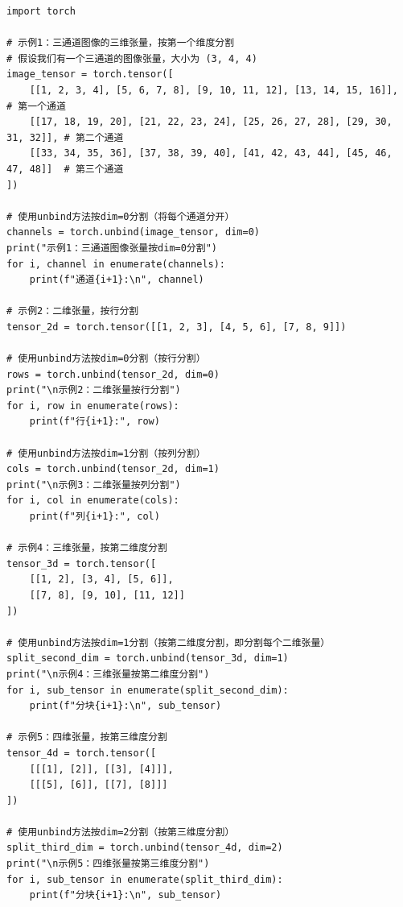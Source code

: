 \begin{lstlisting}[style=pythonstyle]
import torch

# 示例1：三通道图像的三维张量，按第一个维度分割
# 假设我们有一个三通道的图像张量，大小为 (3, 4, 4)
image_tensor = torch.tensor([
    [[1, 2, 3, 4], [5, 6, 7, 8], [9, 10, 11, 12], [13, 14, 15, 16]],    # 第一个通道
    [[17, 18, 19, 20], [21, 22, 23, 24], [25, 26, 27, 28], [29, 30, 31, 32]], # 第二个通道
    [[33, 34, 35, 36], [37, 38, 39, 40], [41, 42, 43, 44], [45, 46, 47, 48]]  # 第三个通道
])

# 使用unbind方法按dim=0分割（将每个通道分开）
channels = torch.unbind(image_tensor, dim=0)
print("示例1：三通道图像张量按dim=0分割")
for i, channel in enumerate(channels):
    print(f"通道{i+1}:\n", channel)

# 示例2：二维张量，按行分割
tensor_2d = torch.tensor([[1, 2, 3], [4, 5, 6], [7, 8, 9]])

# 使用unbind方法按dim=0分割（按行分割）
rows = torch.unbind(tensor_2d, dim=0)
print("\n示例2：二维张量按行分割")
for i, row in enumerate(rows):
    print(f"行{i+1}:", row)

# 使用unbind方法按dim=1分割（按列分割）
cols = torch.unbind(tensor_2d, dim=1)
print("\n示例3：二维张量按列分割")
for i, col in enumerate(cols):
    print(f"列{i+1}:", col)

# 示例4：三维张量，按第二维度分割
tensor_3d = torch.tensor([
    [[1, 2], [3, 4], [5, 6]],
    [[7, 8], [9, 10], [11, 12]]
])

# 使用unbind方法按dim=1分割（按第二维度分割，即分割每个二维张量）
split_second_dim = torch.unbind(tensor_3d, dim=1)
print("\n示例4：三维张量按第二维度分割")
for i, sub_tensor in enumerate(split_second_dim):
    print(f"分块{i+1}:\n", sub_tensor)

# 示例5：四维张量，按第三维度分割
tensor_4d = torch.tensor([
    [[[1], [2]], [[3], [4]]],
    [[[5], [6]], [[7], [8]]]
])

# 使用unbind方法按dim=2分割（按第三维度分割）
split_third_dim = torch.unbind(tensor_4d, dim=2)
print("\n示例5：四维张量按第三维度分割")
for i, sub_tensor in enumerate(split_third_dim):
    print(f"分块{i+1}:\n", sub_tensor)
\end{lstlisting}
